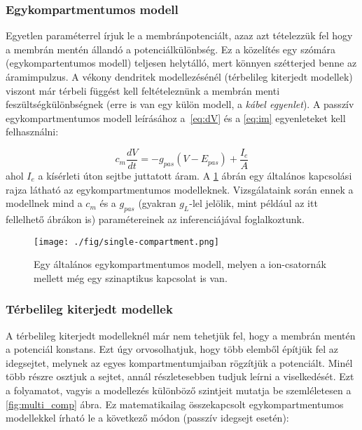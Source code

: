 \subsubsection{Egykompartmentumos modell}\label{sec:single-comp}
Egyetlen paraméterrel írjuk le a membránpotenciált, azaz azt tételezzük fel hogy a membrán mentén állandó a potenciálkülönbség. Ez a közelítés egy szómára (egykompartentumos modell) teljesen helytálló, mert könnyen szétterjed benne az áramimpulzus. A vékony dendritek modellezésénél (térbelileg kiterjedt modellek) viszont már térbeli függést kell feltételeznünk a membrán menti feszültségkülönbségnek (erre is van egy külön modell, a \textit{kábel egyenlet}).
A passzív egykompartmentumos modell leírásához a~\ref{eq:dV} és a \ref{eq:im} egyenleteket kell felhasználni:

\begin{equation}\label{eq:one_comp}
	c_m \dfrac{dV}{dt} = -g_{pas} \left( V-E_{pas} \right) + \dfrac{I_e}{A}
\end{equation}
ahol $I_e$ a kísérleti úton sejtbe juttatott áram. A \ref{fig:single_comp} ábrán egy általános kapcsolási rajza látható az egykompartmentumos modelleknek. Vizsgálataink során ennek a modellnek mind a $c_m$ és a $g_{pas}$ (gyakran $g_L$-lel jelölik, mint például az itt fellelhető ábrákon is) paramétereinek az inferenciájával foglalkoztunk.

\begin{figure}[!htb]
	\centering
	\texttt{[image: ./fig/single-compartment.png]}
	\caption[Egykompartmentumos modell]{\cite{dayan2001theoretical} Egy általános egykompartmentumos modell, melyen a ion-csatornák mellett még egy szinaptikus kapcsolat is van.}
	\label{fig:single_comp}
\end{figure}



\FloatBarrier
\subsubsection{Térbelileg kiterjedt modellek}\label{sec:multi-comp}
A térbelileg kiterjedt modelleknél már nem tehetjük fel, hogy a membrán mentén a potenciál konstans. Ezt úgy orvosolhatjuk, hogy több elemből építjük fel az idegsejtet, melynek az egyes kompartmentumjaiban rögzítjük a potenciált. Minél több részre osztjuk a sejtet, annál részletesebben tudjuk leírni a viselkedését. Ezt a folyamatot, vagyis a modellezés különböző szintjeit mutatja be szemléletesen a \ref{fig:multi_comp} ábra. Ez matematikailag összekapcsolt egykompartmentumos modellekkel írható le a következő módon (passzív idegsejt esetén):

